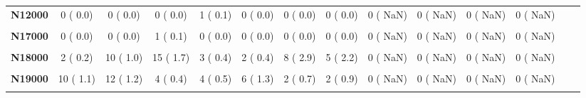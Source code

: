 \documentclass[
]{article}
\begin{document}
\begin{table}[H]
\begin{tabular}[t]{>{\raggedright\arraybackslash}p{5em}ccccccccccccc}
\textbf{N12000} & 0 (  0.0) & 0 (  0.0) & 0 (  0.0) & 1 (  0.1) & 0 (  0.0) & 0 (  0.0) & 0 (  0.0) & 0 (  NaN) & 0 (  NaN) & 0 (  NaN) & 0 (  NaN) &  & \\
\textbf{\cellcolor{gray!10}{N13300}} & \cellcolor{gray!10}{0 (  0.0)} & \cellcolor{gray!10}{0 (  0.0)} & \cellcolor{gray!10}{0 (  0.0)} & \cellcolor{gray!10}{1 (  0.1)} & \cellcolor{gray!10}{0 (  0.0)} & \cellcolor{gray!10}{0 (  0.0)} & \cellcolor{gray!10}{0 (  0.0)} & \cellcolor{gray!10}{0 (  NaN)} & \cellcolor{gray!10}{0 (  NaN)} & \cellcolor{gray!10}{0 (  NaN)} & \cellcolor{gray!10}{0 (  NaN)} & \cellcolor{gray!10}{} & \cellcolor{gray!10}{}\\
\textbf{N17000} & 0 (  0.0) & 0 (  0.0) & 1 (  0.1) & 0 (  0.0) & 0 (  0.0) & 0 (  0.0) & 0 (  0.0) & 0 (  NaN) & 0 (  NaN) & 0 (  NaN) & 0 (  NaN) &  & \\
\textbf{\cellcolor{gray!10}{N17900}} & \cellcolor{gray!10}{11 (  1.2)} & \cellcolor{gray!10}{6 (  0.6)} & \cellcolor{gray!10}{16 (  1.8)} & \cellcolor{gray!10}{13 (  1.8)} & \cellcolor{gray!10}{2 (  0.4)} & \cellcolor{gray!10}{5 (  1.8)} & \cellcolor{gray!10}{2 (  0.9)} & \cellcolor{gray!10}{0 (  NaN)} & \cellcolor{gray!10}{0 (  NaN)} & \cellcolor{gray!10}{0 (  NaN)} & \cellcolor{gray!10}{0 (  NaN)} & \cellcolor{gray!10}{} & \cellcolor{gray!10}{}\\
\textbf{N18000} & 2 (  0.2) & 10 (  1.0) & 15 (  1.7) & 3 (  0.4) & 2 (  0.4) & 8 (  2.9) & 5 (  2.2) & 0 (  NaN) & 0 (  NaN) & 0 (  NaN) & 0 (  NaN) &  & \\
\textbf{\cellcolor{gray!10}{N18900}} & \cellcolor{gray!10}{24 (  2.6)} & \cellcolor{gray!10}{17 (  1.8)} & \cellcolor{gray!10}{15 (  1.7)} & \cellcolor{gray!10}{15 (  2.0)} & \cellcolor{gray!10}{10 (  2.2)} & \cellcolor{gray!10}{10 (  3.7)} & \cellcolor{gray!10}{1 (  0.4)} & \cellcolor{gray!10}{0 (  NaN)} & \cellcolor{gray!10}{0 (  NaN)} & \cellcolor{gray!10}{0 (  NaN)} & \cellcolor{gray!10}{0 (  NaN)} & \cellcolor{gray!10}{} & \cellcolor{gray!10}{}\\
\textbf{N19000} & 10 (  1.1) & 12 (  1.2) & 4 (  0.4) & 4 (  0.5) & 6 (  1.3) & 2 (  0.7) & 2 (  0.9) & 0 (  NaN) & 0 (  NaN) & 0 (  NaN) & 0 (  NaN) &  & \\
\textbf{\cellcolor{gray!10}{N20000}} & \cellcolor{gray!10}{1 (  0.1)} & \cellcolor{gray!10}{0 (  0.0)} & \cellcolor{gray!10}{0 (  0.0)} & \cellcolor{gray!10}{1 (  0.1)} & \cellcolor{gray!10}{1 (  0.2)} & \cellcolor{gray!10}{0 (  0.0)} & \cellcolor{gray!10}{0 (  0.0)} & \cellcolor{gray!10}{0 (  NaN)} & \cellcolor{gray!10}{0 (  NaN)} & \cellcolor{gray!10}{0 (  NaN)} & \cellcolor{gray!10}{0 (  NaN)} & \cellcolor{gray!10}{} & \cellcolor{gray!10}{}\\

\end{tabular}
\end{table}
\end{document}
